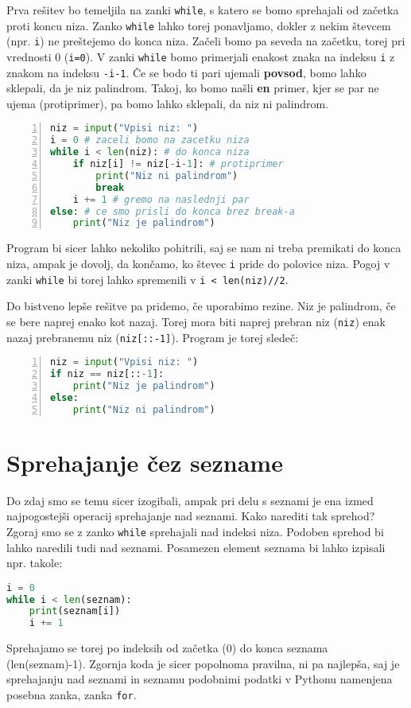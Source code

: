 \begin{resitev}
Prva rešitev bo temeljila na zanki \texttt{while}, s katero se bomo sprehajali od začetka proti koncu niza. Zanko \texttt{while} lahko torej ponavljamo, dokler z nekim števcem (npr. \texttt{i}) ne preštejemo do konca niza. Začeli bomo pa seveda na začetku, torej pri vrednosti 0 (\texttt{i=0}). V zanki \texttt{while} bomo primerjali enakost znaka na indeksu \texttt{i} z znakom na indeksu \texttt{-i-1}. Če se bodo ti pari ujemali \textbf{povsod}, bomo lahko sklepali, da je niz palindrom. Takoj, ko bomo našli \textbf{en} primer, kjer se par ne ujema (protiprimer), pa bomo lahko sklepali, da niz ni palindrom.
\begin{lstlisting}[language=Python, showstringspaces=false,numbers=left]
niz = input("Vpisi niz: ")
i = 0 # zaceli bomo na zacetku niza
while i < len(niz): # do konca niza
    if niz[i] != niz[-i-1]: # protiprimer
        print("Niz ni palindrom")
        break
    i += 1 # gremo na naslednji par
else: # ce smo prisli do konca brez break-a
    print("Niz je palindrom")
\end{lstlisting}
Program bi sicer lahko nekoliko pohitrili, saj se nam ni treba premikati do konca niza, ampak je dovolj, da končamo, ko števec \texttt{i} pride do polovice niza. Pogoj v zanki \texttt{while} bi torej lahko spremenili v \texttt{i < len(niz)//2}.

Do bistveno lepše rešitve pa pridemo, če uporabimo rezine. Niz je palindrom, če se bere naprej enako kot nazaj. Torej mora biti naprej prebran niz (\texttt{niz}) enak nazaj prebranemu niz (\texttt{niz[::-1]}). Program je torej sledeč:
\begin{lstlisting}[language=Python, showstringspaces=false,numbers=left]
niz = input("Vpisi niz: ")
if niz == niz[::-1]:
    print("Niz je palindrom")
else:
    print("Niz ni palindrom")
\end{lstlisting}
\end{resitev}

\section{Sprehajanje čez sezname}
Do zdaj smo se temu sicer izogibali, ampak pri delu s seznami je ena izmed najpogostejši operacij sprehajanje nad seznami. Kako narediti tak sprehod? Zgoraj smo se z zanko \texttt{while} sprehajali nad indeksi niza. Podoben sprehod bi lahko naredili tudi nad seznami. Posamezen element seznama bi lahko izpisali npr. takole:
\begin{lstlisting}[language=Python, showstringspaces=false]
i = 0
while i < len(seznam):
    print(seznam[i])
    i += 1
\end{lstlisting}
Sprehajamo se torej po indeksih od začetka (0) do konca seznama (len(seznam)-1). Zgornja koda je sicer popolnoma pravilna, ni pa najlepša, saj je sprehajanju nad seznami in seznamu podobnimi podatki v Pythonu namenjena posebna zanka, zanka \texttt{for}.